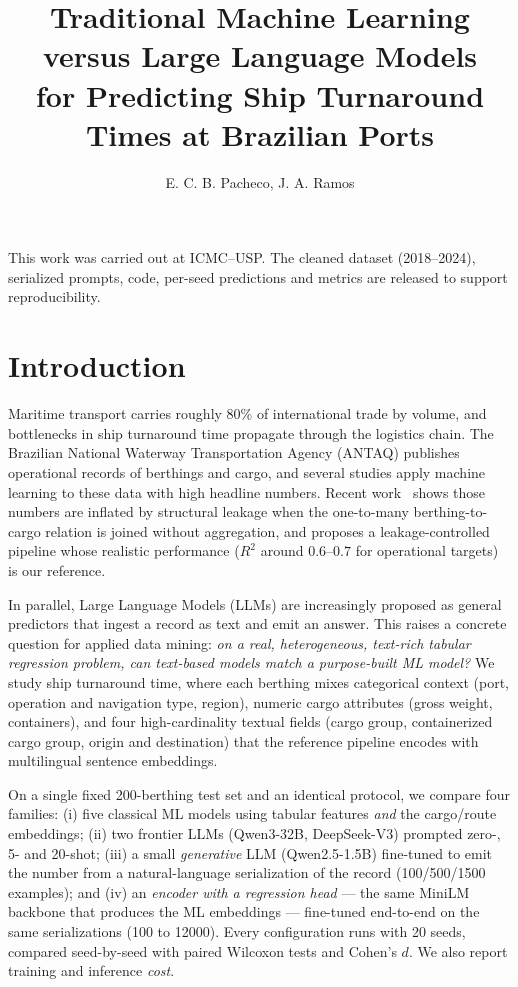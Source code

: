 \documentclass[kdmile,a4paper]{kdmile}
\title{Traditional Machine Learning versus Large Language Models\\
for Predicting Ship Turnaround Times at Brazilian Ports\\}
\author{E. C. B. Pacheco\inst{1}, J. A. Ramos\inst{1}}
\institute{Institute of Mathematics and Computer Sciences (ICMC), University of S\~ao Paulo, S\~ao Carlos, Brazil \\
\email{eduardo.pacheco@usp.br, jonnathanalveskz@outlook.com}}
\begin{document}
\begin{bottomstuff}
This work was carried out at ICMC--USP. The cleaned dataset (2018--2024), serialized prompts, code, per-seed predictions and metrics are released to support reproducibility.
\end{bottomstuff}
\maketitle

\section{Introduction}
Maritime transport carries roughly 80\% of international trade by volume, and bottlenecks in ship turnaround time propagate through the logistics chain. The Brazilian National Waterway Transportation Agency (ANTAQ) publishes operational records of berthings and cargo, and several studies apply machine learning to these data with high headline numbers. Recent work~\cite{pacheco2026pitfalls} shows those numbers are inflated by structural leakage when the one-to-many berthing-to-cargo relation is joined without aggregation, and proposes a leakage-controlled pipeline whose realistic performance ($R^2$ around $0.6$--$0.7$ for operational targets) is our reference.

In parallel, Large Language Models (LLMs) are increasingly proposed as general predictors that ingest a record as text and emit an answer. This raises a concrete question for applied data mining: \emph{on a real, heterogeneous, text-rich tabular regression problem, can text-based models match a purpose-built ML model?} We study ship turnaround time, where each berthing mixes categorical context (port, operation and navigation type, region), numeric cargo attributes (gross weight, containers), and four high-cardinality textual fields (cargo group, containerized cargo group, origin and destination) that the reference pipeline encodes with multilingual sentence embeddings.

On a single fixed 200-berthing test set and an identical protocol, we compare four families: (i) five classical ML models using tabular features \emph{and} the cargo/route embeddings; (ii) two frontier LLMs (Qwen3-32B, DeepSeek-V3) prompted zero-, 5- and 20-shot; (iii) a small \emph{generative} LLM (Qwen2.5-1.5B) fine-tuned to emit the number from a natural-language serialization of the record (100/500/1500 examples); and (iv) an \emph{encoder with a regression head} --- the same MiniLM backbone that produces the ML embeddings --- fine-tuned end-to-end on the same serializations (100 to 12000). Every configuration runs with 20 seeds, compared seed-by-seed with paired Wilcoxon tests and Cohen's $d$. We also report training and inference \emph{cost}.
\end{document}
